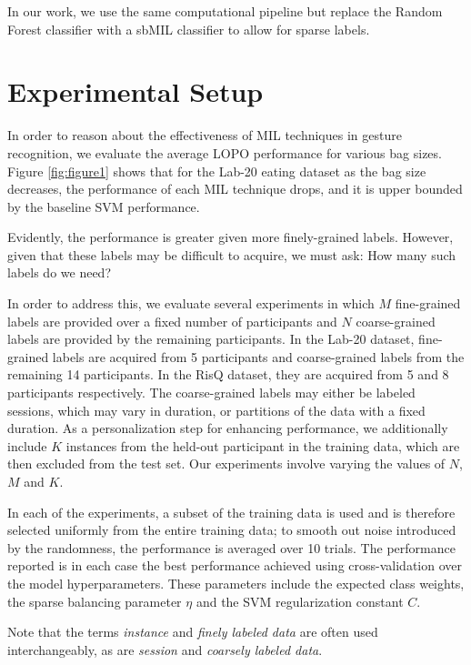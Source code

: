\documentclass{sigchi}
\begin{document}
In our work, we use the same computational pipeline but replace the Random Forest classifier with a sbMIL classifier to allow for sparse labels.

\section{Experimental Setup}

In order to reason about the effectiveness of MIL techniques in gesture recognition, we evaluate the average LOPO performance for various bag sizes. Figure \ref{fig:figure1} shows that for the Lab-20 eating dataset as the bag size decreases, the performance of each MIL technique drops, and it is upper bounded by the baseline SVM performance.

Evidently, the performance is greater given more finely-grained labels. However, given that these labels may be difficult to acquire, we must ask: How many such labels do we need?

In order to address this, we evaluate several experiments in which $M$ fine-grained labels are provided over a fixed number of participants and $N$ coarse-grained labels are provided by the remaining participants. In the Lab-20 dataset, fine-grained labels are acquired from 5 participants and coarse-grained labels from the remaining 14 participants. In the RisQ dataset, they are acquired from 5 and 8 participants respectively. The coarse-grained labels may either be labeled sessions, which may vary in duration, or partitions of the data with a fixed duration. As a personalization step for enhancing performance, we additionally include $K$ instances from the held-out participant in the training data, which are then excluded from the test set. Our experiments involve varying the values of $N$, $M$ and $K$.

In each of the experiments, a subset of the training data is used and is therefore selected uniformly from the entire training data; to smooth out noise introduced by the randomness, the performance is averaged over 10 trials. The performance reported is in each case the best performance achieved using cross-validation over the model hyperparameters. These parameters include the expected class weights, the sparse balancing parameter $\eta$ and the SVM regularization constant $C$.

Note that the terms \textit{instance} and \textit{finely labeled data} are often used interchangeably, as are \textit{session} and \textit{coarsely labeled data}.
\end{document}
